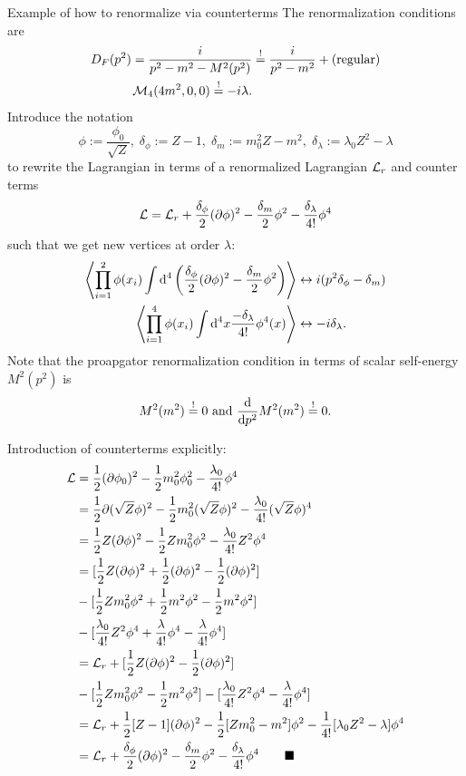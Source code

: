 \begin{mybox}{Example of how to renormalize via counterterms}
	The renormalization conditions are
	\begin{align}
		D_F(p^2) = \frac{i}{p^2-m^2-M^2(p^2)} &\stackrel{!}{=} \frac{i}{p^2-m^2} + (\text{regular})\\
		\mathcal{M}_4(4m^2,0,0) \stackrel{!}{=} -i\lambda.
	\end{align}
	Introduce the notation
	\begin{equation}
	\phi := \frac{\phi_0}{\sqrt{Z}},\; \delta_\phi:= Z-1,\; \delta_m:= m^2_0 Z-m^2,\; \delta_\lambda:= \lambda_0 Z^2-\lambda
	\end{equation}
	to rewrite the Lagrangian in terms of a renormalized Lagrangian $\mathcal{L}_r$ and counter terms
	\begin{equation}
	\mathcal{L} = \mathcal{L}_r+\frac{\delta_\phi}{2} (\partial \phi)^2 - \frac{\delta_m}{2} \phi^2 - \frac{\delta_\lambda}{4!} \phi^4
	\end{equation}
	such that we get new vertices at order $\lambda$:
	\begin{align}
		\expval{ \prod_{i=1}^{2}\phi(x_i) \int \mathrm{d}^4  \left(\frac{\delta_\phi}{2} (\partial \phi)^2 - \frac{\delta_m}{2} \phi^2\right)} &\leftrightarrow i(p^2\delta_\phi -\delta_m) \\
		\expval{ \prod_{i=1}^4 \phi(x_i) \int \mathrm{d}^4x \frac{-\delta_\lambda}{4!}\phi^4 (x) } &\leftrightarrow -i \delta_{\lambda}.
	\end{align}
	Note that the proapgator renormalization condition in terms of scalar self-energy $M^2(p^2)$ is
	\begin{equation}
	M^2(m^2) \stackrel{!}{=}0 \text{  and  } \frac{\mathrm{d}}{\mathrm{d} p^2}M^2(m^2) \stackrel{!}{=}0.
	\end{equation}
\end{mybox}
Introduction of counterterms explicitly:
\begin{align*}
	\mathcal{L} &= \frac{1}{2} (\partial \phi_0)^2 -\frac{1}{2} m^2_0 \phi^2_0 - \frac{\lambda_0}{4!} \phi^4 \\
	&= \frac{1}{2} \partial(\sqrt{Z}\phi)^2-\frac{1}{2} m^2_0(\sqrt{Z}\phi)^2 - \frac{\lambda_0}{4!}(\sqrt{Z} \phi)^4 \\
	&= \frac{1}{2} Z(\partial \phi)^2 - \frac{1}{2} Z m^2_0 \phi^2 - \frac{\lambda_0}{4!} Z^2 \phi^4 \\
	&= [\frac{1}{2} Z(\partial \phi)^2+\frac{1}{2} (\partial \phi)^2-\frac{1}{2} (\partial \phi)^2] \\
	&-[\frac{1}{2} Zm^2_0 \phi^2+\frac{1}{2} m^2 \phi^2-\frac{1}{2} m^2\phi^2] \\
	&- [\frac{\lambda_0}{4!}Z^2\phi^4 + \frac{\lambda}{4!} \phi^4-\frac{\lambda}{4!}\phi^4 ]\\
	&= \mathcal{L}_r + [\frac{1}{2} Z(\partial \phi)^2-\frac{1}{2}(\partial \phi)^2]\\
	&-[\frac{1}{2} Z m^2_0 \phi^2-\frac{1}{2} m^2\phi^2] - [\frac{\lambda_0}{4!} Z^2 \phi^4 -\frac{\lambda}{4!} \phi^4] \\
	&=\mathcal{L}_r + \frac{1}{2} [Z-1] (\partial \phi)^2 - \frac{1}{2} [Zm^2_0-m^2] \phi^2-\frac{1}{4!} [\lambda_0 Z^2-\lambda] \phi^4\\
	&= \mathcal{L}_r+ \frac{\delta_\phi}{2} (\partial \phi)^2 -\frac{\delta_m}{2} \phi^2 - \frac{\delta_\lambda}{4!}\phi^4 \qquad \blacksquare
\end{align*}
